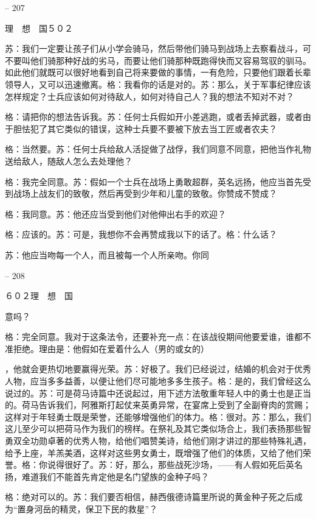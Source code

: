 \documentclass[11pt,oneside]{book}
\begin{document}
\begin{common-format}
    

-- 207

    理　想　国５０２

    苏：我们一定要让孩子们从小学会骑马，然后带他们骑马到战场上去察看战斗，可不要叫他们骑那种好战的劣马，而要让他们骑那种既跑得快而又容易驾驭的驯马。如此他们就既可以很好地看到自己将来要做的事情，一有危险，只要他们跟着长辈领导人，又可以迅速撤离。格：我看你的话是对的。苏：那么，关于军事纪律应该怎样规定？士兵应该如何对待敌人，如何对待自己人？我的想法不知对不对？

    格：请把你的想法告诉我。苏：任何士兵假如开小差逃跑，或者丢掉武器，或者由于胆怯犯了其它类似的错误，这种士兵要不要被下放去当工匠或者农夫？

    格：当然要。苏：任何士兵给敌人活捉做了战俘，我们同意不同意，把他当作礼物送给敌人，随敌人怎么去处理他？

    格：我完全同意。苏：假如一个士兵在战场上勇敢超群，英名远扬，他应当首先受到战场上战友们的致敬，然后再受到少年和儿童的致敬。你赞成不赞成？

    格：我同意。苏：他还应当受到他们对他伸出右手的欢迎？

    格：应该的。苏：可是，我想你不会再赞成我以下的话了。格：什么话？

    苏：他应当吻每一个人，而且被每一个人所亲吻。你同

    

-- 208

    ６０２理　想　国

    意吗？

    格：完全同意。我对于这条法令，还要补充一点：在该战役期间他要爱谁，谁都不准拒绝。理由是：他假如在爱着什么人（男的或女的）

    ，他就会更热切地要赢得光荣。苏：好极了。我们已经说过，结婚的机会对于优秀人物，应当多多益善，以便让他们尽可能地多多生孩子。格：是的，我们曾经这么说过的。苏：可是荷马诗篇中还说起过，用下述方法敬重年轻人中的勇士也是正当的。荷马告诉我们，阿雅斯打起仗来英勇异常，在宴席上受到了全副脊肉的赏赐；这样对于年轻勇士既是荣誉，还能够增强他们的体力。格：很对。苏：那么，我们这儿至少可以把荷马作为我们的榜样。在祭礼及其它类似场合上，我们表扬那些智勇双全功勋卓著的优秀人物，给他们唱赞美诗，给他们刚才讲过的那些特殊礼遇，给予上座，羊羔美酒，这样对这些男女勇士，既增强了他们的体质，又给了他们荣誉。格：你说得很好了。苏：好，那么，那些战死沙场，——有人假如死后英名扬，难道我们不能首先肯定他是名门望族的金种子吗？

    格：绝对可以的。苏：我们要否相信，赫西俄德诗篇里所说的黄金种子死之后成为“置身河岳的精灵，保卫下民的救星”？


\end{common-format}
\end{document}
